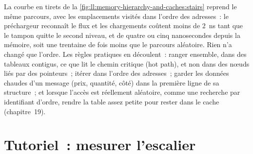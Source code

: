 La courbe en tirets de la \cref{fig:ll:memory-hierarchy-and-caches:stairs} reprend le même parcours, avec les emplacements visités dans
l'ordre des adresses~: le préchargeur reconnaît le flux et les chargements coûtent moins de \qty{2}{\nano\second} tant que le tampon quitte le
second niveau, et de quatre ou cinq nanosecondes depuis la mémoire, soit une trentaine de fois moins que le parcours aléatoire. Rien n'a changé que
l'ordre. Les règles pratiques en découlent~: ranger ensemble, dans des tableaux contigus, ce que lit le chemin critique (hot path), et non dans des nœuds
liés par des pointeurs~; itérer dans l'ordre des adresses~; garder les données chaudes d'un message (prix, quantité, côté) dans la première ligne de sa
structure~; et lorsque l'accès est réellement aléatoire, comme une recherche par identifiant d'ordre, rendre la table assez petite pour rester dans le cache
(chapitre~19).

\section{Tutoriel~: mesurer l'escalier}\label{tut:ll:memory-hierarchy-and-caches:tut}

